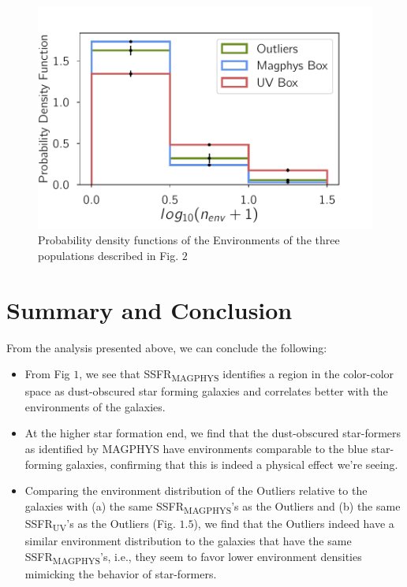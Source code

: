 \begin{figure}
\includegraphics[width=\textwidth]{figures/4_jk_plot.pdf}
\caption[Environments of the outliers compared to the other populations]
{Probability density functions of the Environments of the three populations described in Fig. $2$
\label{fig:munny_plot}}
\end{figure}

\section{Summary and Conclusion}

From the analysis presented above, we can conclude the following:
 \begin{itemize}
 \item{From Fig $1$, we see that SSFR\textsubscript{MAGPHYS} identifies a region in the color-color space as dust-obscured star forming galaxies and correlates better with the environments of the galaxies.}
 \item{At the higher star formation end, we find that the dust-obscured star-formers as identified by MAGPHYS have environments comparable to the blue star-forming galaxies, confirming that this is indeed a physical effect we're seeing.}
 \item{Comparing the environment distribution of the Outliers relative to the galaxies with (a) the same SSFR\textsubscript{MAGPHYS}'s as the Outliers and (b) the same SSFR\textsubscript{UV}'s as the Outliers (Fig. $1.5$), we find that the Outliers indeed have a similar environment distribution to the galaxies that have the same SSFR\textsubscript{MAGPHYS}'s, i.e., they seem to favor lower environment densities mimicking the behavior of star-formers.}
 \end{itemize}
 
